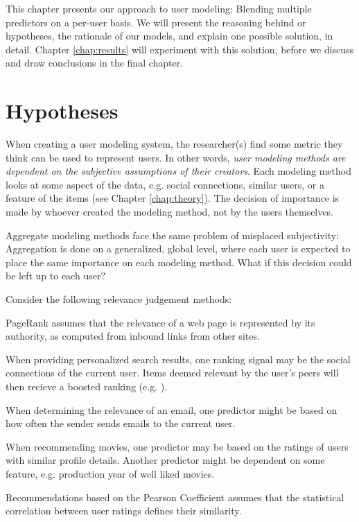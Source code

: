 This chapter presents our approach to user modeling:
Blending multiple predictors on a per-user basis.
We will present the reasoning behind or hypotheses,
the rationale of our models,
and explain one possible solution, in detail.
Chapter \ref{chap:results} will experiment with this solution,
before we discuss and draw conclusions in the final chapter.


\section{Hypotheses}

When creating a user modeling system, the researcher(s) find some metric they think can be used
to represent users. In other words,
\emph{user modeling methods are dependent on the subjective assumptions of their creators}.
Each modeling method looks at some aspect of the data, e.g. social connections, similar users,
or a feature of the items (see Chapter \ref{chap:theory}). 
The decision of importance is made by whoever created the modeling method, not by the users themselves.

Aggregate modeling methods face the same problem of misplaced subjectivity: 
Aggregation is done on a generalized, global level,
where each user is expected to place the same importance on each modeling method.
What if this decision could be left up to each user?

Consider the following relevance judgement methods:

\begin{itemize*}
  \item PageRank \citep{Bender2005} assumes that the relevance of a web page is 
  represented by its authority, as computed from inbound links from other sites.
  \item When providing personalized search results, one ranking signal may be 
  the social connections of the current user. Items deemed relevant by the user's 
  peers will then recieve a boosted ranking (e.g. \cite{Carmel2009}).
  \item When determining the relevance of an email, one predictor might be based
  on how often the sender sends emails to the current user.
  \item When recommending movies, one predictor may be based on the ratings
  of users with similar profile details. Another predictor might be 
  dependent on some feature, e.g. production year of well liked movies.
  \item Recommendations based on the Pearson Coefficient \cite[p11]{Segaran2007}
  assumes that the statistical correlation between user ratings defines their 
  similarity.
\end{itemize*}

